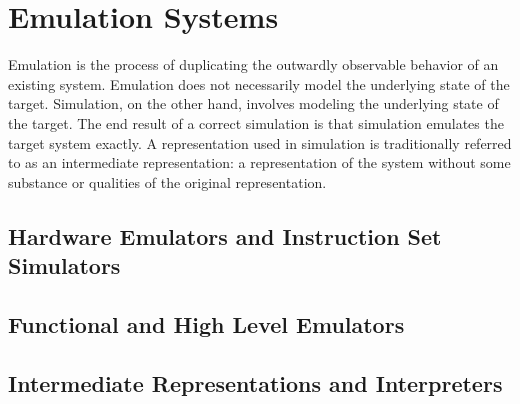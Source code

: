 \chapter{Emulation Systems}
\label{chap:emulation}

Emulation is the process of duplicating the outwardly observable behavior of an existing system.
Emulation does not necessarily model the underlying state of the target.
Simulation, on the other hand, involves modeling the underlying state of the target.
The end result of a correct simulation is that simulation emulates the target system exactly.
A representation used in simulation is traditionally referred to as an intermediate representation: a representation of the system without some substance or qualities of the original representation.

\section{Hardware Emulators and Instruction Set Simulators}
\label{sec:hardemu}

\section{Functional and High Level Emulators}

\section{Intermediate Representations and Interpreters}


